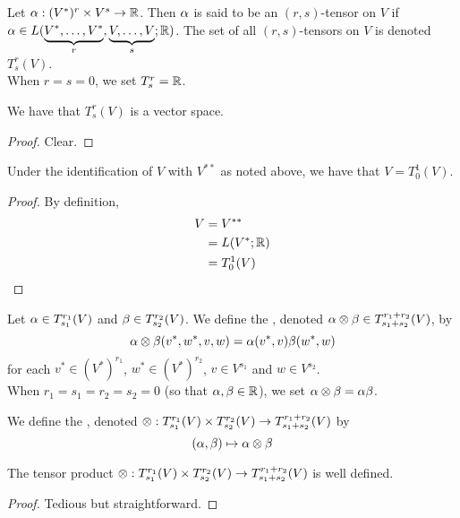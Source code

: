 \documentclass{book}
\begin{document}
	\begin{defn}
	Let $\alpha: (V^*)^r \times V^s \rightarrow \mathbb{R}$. Then $\alpha$ is said to be an $(r,s)$-tensor on $V$ if $\alpha \in L(\underbrace{V^*, \dots, V^*}_{r}, \underbrace{V, \dots, V}_{s}; \mathbb{R})$. The set of all $(r,s)$-tensors on $V$ is denoted $T^r_s(V)$. \\
	When $r=s=0$, we set $T^r_s = \mathbb{R}$.
	\end{defn}
	
	\begin{ex}
		We have that $T^r_s(V)$ is a vector space. 
	\end{ex}

	\begin{proof}
		Clear.
	\end{proof}
	
	\begin{ex}
	Under the identification of $V$ with $V^{**}$ as noted above, we have that $V = T^1_0(V)$. 
	\end{ex}
	
	\begin{proof}
	By definition,
	\begin{align*}
	V 
	&= V^{**} \\
	&= L(V^*; \mathbb{R}) \\
	&= T^1_0(V)
	\end{align*}
	\end{proof}
	
	\begin{defn}
	Let $\alpha \in T^{r_{1}}_{s_{1}}(V)$ and $\beta \in T^{r_{2}}_{s_{2}}(V)$. We define the , denoted $\alpha \otimes \beta \in T^{r_1+r_2}_{s_1+s_2}(V)$, by $$\alpha \otimes \beta (v^*, w^*, v, w) = \alpha(v^*, v) \beta(w^*, w)$$ for each $v^* \in (V^*)^{r_1}$, $w^* \in (V^*)^{r_2}$, $v \in V^{s_1}$ and $w \in V^{s_2}$.\\
	When $r_1=s_1=r_2=s_2= 0$ (so that $\alpha, \beta \in \mathbb{R}$), we set $\alpha \otimes \beta = \alpha \beta$.
	\end{defn}
	
	\begin{defn}
	We define the , denoted $\otimes : T^{r_{1}}_{s_{1}}(V) \times  T^{r_{2}}_{s_{2}}(V) \rightarrow T^{r_1 + r_2}_{s_1 + s_2}(V)$ by $$(\alpha, \beta) \mapsto \alpha \otimes \beta $$   
	\end{defn}
	
	\begin{ex}
	The tensor product $\otimes : T^{r_{1}}_{s_{1}}(V) \times  T^{r_{2}}_{s_{2}}(V) \rightarrow T^{r_1 + r_2}_{s_1 + s_2}(V)$ is well defined. 
	\end{ex}
	
	\begin{proof}
	Tedious but straightforward.
\end{proof}	
	
\end{document}
